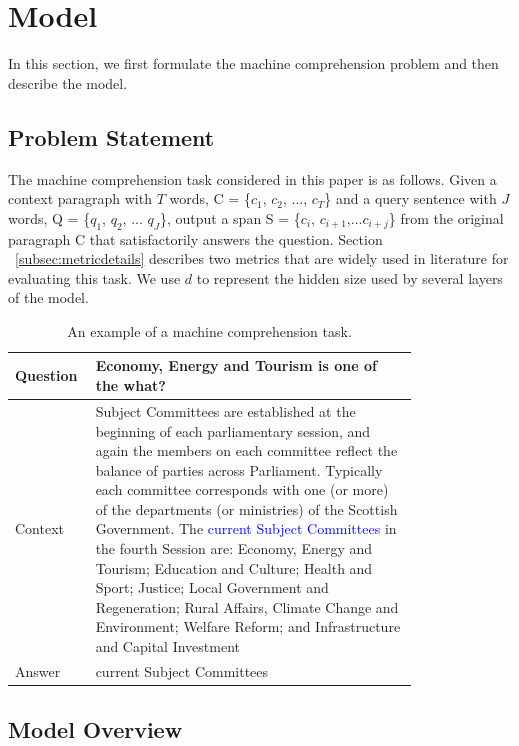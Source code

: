\section{Model}
\label{sec:model}

In this section, we first formulate the machine comprehension problem and then describe the model. 

\subsection{Problem Statement}
\label{subsec:problemstatement}

The machine comprehension task considered in this paper is as follows. Given a context paragraph with $T$ words, C = \{$c_1$, $c_2$, ..., $c_T$\} and a query sentence with $J$ words, Q = \{$q_1$, $q_2$, ... $q_J$\}, output a span S = \{$c_i$, $c_{i+1}$,...${c_{i+j}}$\} from the original paragraph C that satisfactorily answers the question. Section ~\ref{subsec:metricdetails} describes two metrics that are widely used in literature for evaluating this task. We use $d$ to represent the hidden size used by several layers of the model.

\begin{table}[htbp]
    \caption{An example of a machine comprehension task.}
    \label{table:economicSchools} 
    \centering
    \begin{tabular}{|l|p{0.8\linewidth}|}
    \hline
    Question   &  Economy, Energy and Tourism is one of the what? \tabularnewline \hline
    Context  & Subject Committees are established at the beginning of each parliamentary session, and again the members on each committee reflect the balance of parties across Parliament. Typically each committee corresponds with one (or more) of the departments (or ministries) of the Scottish Government. The \textcolor{blue}{current Subject Committees} in the fourth Session are: Economy, Energy and Tourism; Education and Culture; Health and Sport; Justice; Local Government and Regeneration; Rural Affairs, Climate Change and Environment; Welfare Reform; and Infrastructure and Capital Investment \tabularnewline \hline
    Answer   & current Subject Committees \tabularnewline \hline
    \end{tabular}
 
\end{table}

\subsection{Model Overview}
\label{subsec:models}

